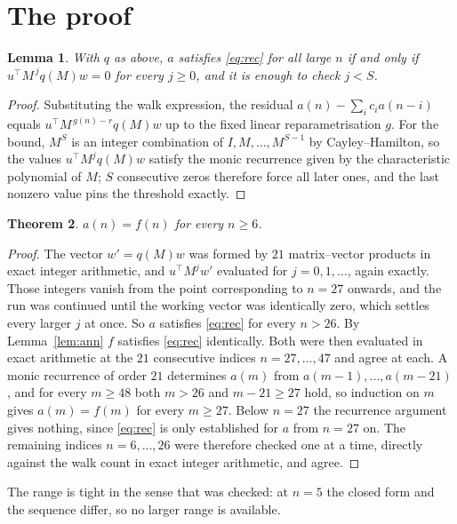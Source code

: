 \documentclass[11pt,a4paper]{article}
\theoremstyle{plain}
\newtheorem{theorem}{Theorem}
\newtheorem{lemma}[theorem]{Lemma}
\theoremstyle{definition}
\begin{document}
\section{The proof}

\begin{lemma}\label{lem:crit}
With $q$ as above, $a$ satisfies \eqref{eq:rec} for all large $n$ if and only if
$u^{\!\top}M^{\,j}q(M)w=0$ for every $j\ge0$, and it is enough to check $j<S$.
\end{lemma}

\begin{proof}
Substituting the walk expression, the residual $a(n)-\sum_ic_ia(n-i)$ equals
$u^{\!\top}M^{\,g(n)-r}q(M)w$ up to the fixed linear reparametrisation $g$. For the bound,
$M^{S}$ is an integer combination of $I,M,\dots,M^{S-1}$ by Cayley--Hamilton, so the values
$u^{\!\top}M^{j}q(M)w$ satisfy the monic recurrence given by the characteristic polynomial of
$M$; $S$ consecutive zeros therefore force all later ones, and the last nonzero value pins the
threshold exactly.
\end{proof}

\begin{theorem}
$a(n)=f(n)$ for every $n\ge6$.
\end{theorem}

\begin{proof}
The vector $w'=q(M)w$ was formed by $21$ matrix--vector products in exact integer
arithmetic, and $u^{\!\top}M^{j}w'$ evaluated for $j=0,1,\dots$, again exactly. Those integers
vanish from the point corresponding to $n=27$ onwards, and the run was continued until the
working vector was identically zero, which settles every larger $j$ at once. So $a$ satisfies
\eqref{eq:rec} for every $n>26$. By Lemma~\ref{lem:ann} $f$ satisfies \eqref{eq:rec}
identically. Both were then evaluated in exact arithmetic at the $21$ consecutive indices
$n=27,\dots,47$ and agree at each. A monic recurrence of order $21$
determines $a(m)$ from $a(m-1),\dots,a(m-21)$, and for every $m\ge48$ both
$m>26$ and $m-21\ge27$ hold, so induction on $m$ gives $a(m)=f(m)$ for every
$m\ge27$.
Below $n=27$ the recurrence argument gives nothing, since \eqref{eq:rec} is only
established for $a$ from $n=27$ on. The remaining indices $n=6,\dots,26$ were
therefore checked one at a time, directly against the walk count in exact integer arithmetic,
and agree.
\end{proof}

The range is tight in the sense that was checked: at $n=5$ the closed form and the sequence differ, so no larger range is available.
\end{document}
